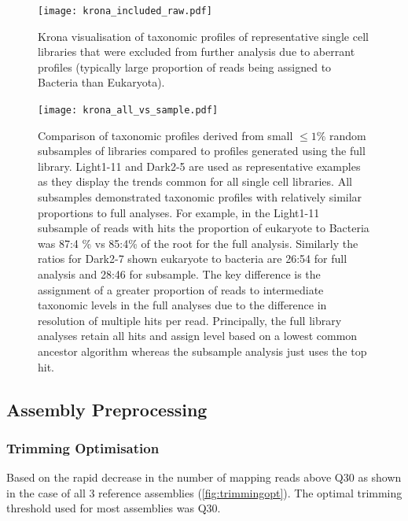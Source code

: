 \begin{figure}[h]
    \texttt{[image: krona\_included\_raw.pdf]}
    \caption{
    Krona visualisation of taxonomic profiles of representative
    single cell libraries that were excluded from further analysis due 
    to aberrant profiles (typically large proportion of reads being assigned
    to Bacteria than Eukaryota).  
    }
    \label{fig:krona_included}
\end{figure}


\begin{figure}[h]
    \texttt{[image: krona\_all\_vs\_sample.pdf]}
    \caption{Comparison of taxonomic profiles derived from small \(\leq1\%\)
        random subsamples of libraries compared to profiles generated using the
        full library.  Light1-11 and Dark2-5 are used as representative examples
        as they display the trends common for all single cell libraries. 
        All subsamples demonstrated taxonomic profiles with relatively similar
        proportions to full analyses.  For example, in the Light1-11 subsample
        of reads with hits the proportion of eukaryote to Bacteria was 87:4 
        \% vs 85:4\% of the root for the full analysis. Similarly the ratios
        for Dark2-7 shown eukaryote to bacteria are 26:54 for full analysis
        and 28:46 for subsample. 
        The key difference is the assignment of a greater proportion of reads to 
        intermediate taxonomic levels in the full analyses due to the difference in 
        resolution of multiple hits per read.  Principally, the full library analyses
        retain all hits and assign level based on a lowest common ancestor algorithm
        whereas the subsample analysis just uses the top hit.
    }
    \label{fig:krona_sample_vs_full}
\end{figure}


\subsection{Assembly Preprocessing} 

\subsubsection{Trimming Optimisation}

Based on the rapid decrease in the number of mapping reads above Q30
as shown in the case of all 3 reference assemblies (\ref{fig:trimmingopt}). 
The optimal trimming threshold used for most assemblies was Q30. 


